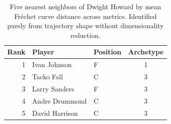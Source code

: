\begin{table}[htbp]
  \centering\small
  \begin{tabular}{rllc}
    \toprule
    Rank & Player & Position & Archetype \\
    \midrule
    1 & Ivan Johnson & F & 1 \\
    2 & Tacko Fall & C & 3 \\
    3 & Larry Sanders & F & 3 \\
    4 & Andre Drummond & C & 3 \\
    5 & David Harrison & C & 3 \\
    \bottomrule
  \end{tabular}
  \caption{Five nearest neighbors of Dwight Howard by mean Fr\'{e}chet curve distance across metrics. Identified purely from trajectory shape without dimensionality reduction.}
  \label{tab:Dwight_Howard_frechet_curve_neighbors}
\end{table}

